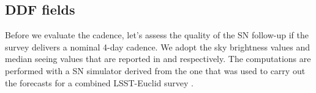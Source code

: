 \documentclass[\docopts]{\docclass}
\begin{document}
\subsection{DDF fields}

Before we evaluate the  cadence, let's assess the
quality of the SN follow-up if the survey delivers a nominal 4-day
cadence. We adopt the sky brightness values and median seeing values
that are reported in \cite{LSE-40} and \cite{SMTN-002} respectively.
The computations are performed with a SN simulator derived from the
one that was used to carry out the forecasts for a combined
LSST-Euclid survey \cite{2014A&A...572A..80A}.


\begin{figure}
\begin{center}

\end{center}
\end{figure}
\end{document}
